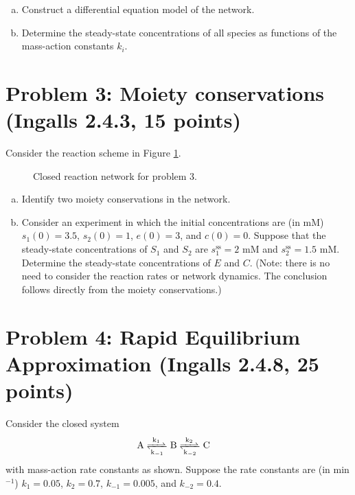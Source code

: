 \documentclass{article}
\begin{document}
\begin{enumerate}[a)]
\setlength{\itemsep}{0pt}
\item Construct a differential equation model of the network.
\item Determine the steady-state concentrations of all species as functions of the mass-action \linebreak constants $k_i$.
\end{enumerate}

\section*{Problem 3: Moiety conservations (Ingalls 2.4.3, 15 points)}

Consider the reaction scheme in Figure \ref{fig:fig2}.

\begin{figure}[htp] 
\caption{Closed reaction network for problem 3.} \label{fig:fig2}
\end{figure}  

\begin{enumerate}[a)]
\setlength{\itemsep}{0pt}
\item Identify two moiety conservations in the network.
\item Consider an experiment in which the initial concentrations are (in mM) $s_1(0) = 3.5$, $s_2(0) = 1$,  $e(0) = 3$, and $c(0) = 0$. Suppose that the steady-state concentrations of $S_1$ and $S_2$ are $s_1^{\textrm{ss}} = 2$ mM and $s_2^{\textrm{ss}} = 1.5$ mM. Determine the steady-state concentrations of $E$ and $C$. (Note: there is no need to consider the reaction rates or network dynamics. The conclusion follows directly from the moiety conservations.)
\end{enumerate}

\section*{Problem 4: Rapid Equilibrium Approximation (Ingalls 2.4.8, 25 points)}

Consider the closed system
\begin{eqnarray*}
& \ce{\textrm{A} <=>[k_1][k_{-1}]  \textrm{B}  <=>[k_2][k_{-2}] \textrm{C}} &
\end{eqnarray*}
with mass-action rate constants as shown. Suppose the rate constants are (in min$^{-1}$) $k_1 = 0.05$, $k_2 = 0.7$, $k_{-1} = 0.005$, and $k_{-2} = 0.4$.
\end{document}

